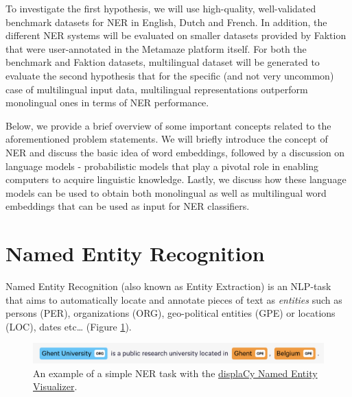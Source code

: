 \documentclass[12pt,a4paper,]{book}
\begin{document}
To investigate the first hypothesis, we will use high-quality, well-validated benchmark datasets for NER in English, Dutch and French. In addition, the different NER systems will be evaluated on smaller datasets provided by Faktion that were user-annotated in the Metamaze platform itself. For both the benchmark and Faktion datasets, multilingual dataset will be generated to evaluate the second hypothesis that for the specific (and not very uncommon) case of multilingual input data, multilingual representations outperform monolingual ones in terms of NER performance.

Below, we provide a brief overview of some important concepts related to the aforementioned problem statements. We will briefly introduce the concept of NER and discuss the basic idea of word embeddings, followed by a discussion on language models - probabilistic models that play a pivotal role in enabling computers to acquire linguistic knowledge. Lastly, we discuss how these language models can be used to obtain both monolingual as well as multilingual word embeddings that can be used as input for NER classifiers.

\hypertarget{named-entity-recognition}{%
\section{Named Entity Recognition}\label{named-entity-recognition}}

Named Entity Recognition (also known as Entity Extraction) is an NLP-task that aims to automatically locate and annotate pieces of text as \emph{entities} such as persons (PER), organizations (ORG), geo-political entities (GPE) or locations (LOC), dates etc\ldots{} (Figure \ref{fig:ner-example}).

\begin{figure}

{\centering \includegraphics[width=1\linewidth]{images/ner_example} 

}

\caption{An example of a simple NER task with the \href{https://explosion.ai/demos/displacy-ent}{displaCy Named Entity Visualizer}.}\label{fig:ner-example}
\end{figure}
\end{document}
